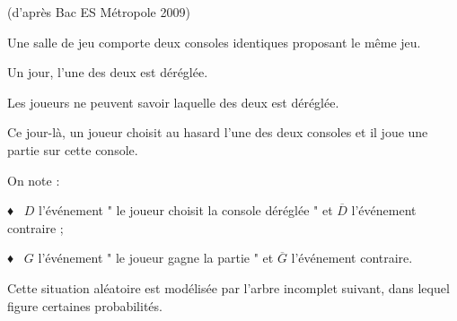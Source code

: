 
%
(d'après Bac ES Métropole 2009)
\par
Une salle de jeu comporte deux consoles identiques proposant le même jeu.
\par
Un jour, l'une des deux est déréglée.
\par
Les joueurs ne peuvent savoir laquelle des deux est déréglée.
\par
Ce jour-là, un joueur choisit au hasard l'une des deux consoles et il joue une partie sur cette console.
\par
On note :
\par
♦ ~$D$ l'événement " le joueur choisit la console déréglée " et $ \overline{D}$ l'événement contraire ;
\par
♦ ~$G$ l'événement " le joueur gagne la partie " et $ \overline{G}$  l'événement contraire.
\par
Cette situation aléatoire est modélisée par l'arbre incomplet suivant, dans lequel figure certaines probabilités.
\begin{center}
 \begin{extern}%
   \end{extern}
\end{center}
